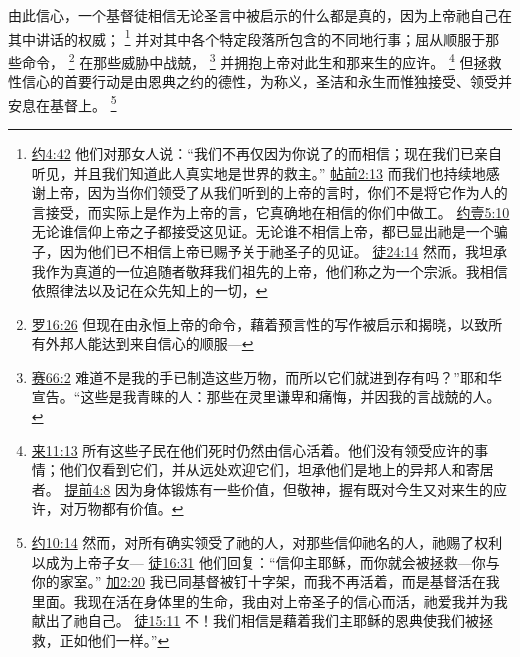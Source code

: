 \documentclass[12pt, a4paper, oneside]{ctexart}
\newcounter{parnum}[section]
\newcommand{\N}{%
   \noindent\refstepcounter{parnum}%
    \makebox[\parindent][l]{\textbf{\arabic{parnum}.}}}
\begin{document}
\N 由此信心，一个基督徒相信无论圣言中被启示的什么都是真的，因为上帝祂自己在其中讲话的权威；
	\footnote {
		\href{https://biblehub.com/john/4-42.htm}{约4:42} 他们对那女人说：“我们不再仅因为你说了的而相信；现在我们已亲自听见，并且我们知道此人真实地是世界的救主。”
		\href{https://biblehub.com/1_thessalonians/2-13.htm}{帖前2:13} 而我们也持续地感谢上帝，因为当你们领受了从我们听到的上帝的言时，你们不是将它作为人的言接受，而实际上是作为上帝的言，它真确地在相信的你们中做工。
		\href{https://biblehub.com/1_john/5-10.htm}{约壹5:10} 无论谁信仰上帝之子都接受这见证。无论谁不相信上帝，都已显出祂是一个骗子，因为他们已不相信上帝已赐予关于祂圣子的见证。
		\href{https://biblehub.com/acts/24-14.htm}{徒24:14} 然而，我坦承我作为真道的一位追随者敬拜我们祖先的上帝，他们称之为一个宗派。我相信依照律法以及记在众先知上的一切，
	}
	并对其中各个特定段落所包含的不同地行事；屈从顺服于那些命令，
	\footnote {
		\href{https://biblehub.com/romans/16-26.htm}{罗16:26} 但现在由永恒上帝的命令，藉着预言性的写作被启示和揭晓，以致所有外邦人能达到来自信心的顺服---
	}
	在那些威胁中战兢，
	\footnote {
		\href{https://biblehub.com/isaiah/66-2.htm}{赛66:2} 难道不是我的手已制造这些万物，而所以它们就进到存有吗？”耶和华宣告。“这些是我青睐的人：那些在灵里谦卑和痛悔，并因我的言战兢的人。
	}
	并拥抱上帝对此生和那来生的应许。
	\footnote {
		\href{https://biblehub.com/hebrews/11-13.htm}{来11:13} 所有这些子民在他们死时仍然由信心活着。他们没有领受应许的事情；他们仅看到它们，并从远处欢迎它们，坦承他们是地上的异邦人和寄居者。
		\href{https://biblehub.com/1_timothy/4-8.htm}{提前4:8} 因为身体锻炼有一些价值，但敬神，握有既对今生又对来生的应许，对万物都有价值。
	}
	但拯救性信心的首要行动是由恩典之约的德性，为称义，圣洁和永生而惟独接受、领受并安息在基督上。
	\footnote {
		\href{https://biblehub.com/john/1-12.htm}{约10:14} 然而，对所有确实领受了祂的人，对那些信仰祂名的人，祂赐了权利以成为上帝子女---
		\href{https://biblehub.com/acts/16-31.htm}{徒16:31} 他们回复：“信仰主耶稣，而你就会被拯救---你与你的家室。”
		\href{https://biblehub.com/galatians/2-20.htm}{加2:20} 我已同基督被钉十字架，而我不再活着，而是基督活在我里面。我现在活在身体里的生命，我由对上帝圣子的信心而活，祂爱我并为我献出了祂自己。
		\href{https://biblehub.com/acts/15-11.htm}{徒15:11} 不！我们相信是藉着我们主耶稣的恩典使我们被拯救，正如他们一样。”
	}
\end{document}
